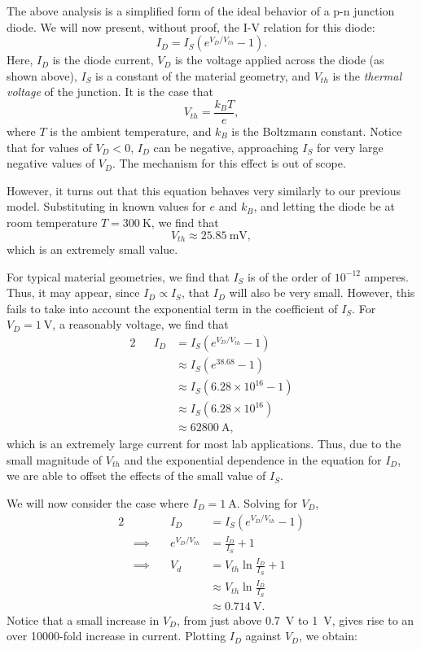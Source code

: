 \documentclass[letterpaper]{article}
\theoremstyle{remark}
\newcommand{\eqn}[1]{\begin{alignat*}{2}#1\end{alignat*}}
\newcommand*{\thus}{&\implies\quad&}
\begin{document}
The above analysis is a simplified form of the ideal behavior of a p-n junction diode. We will now present, without proof, the I-V relation for this diode:
\[
    I_D = I_S(e^{V_D / V_{th}} - 1).
\]
Here, $I_D$ is the diode current, $V_D$ is the voltage applied across the diode (as shown above), $I_S$ is a constant of the material geometry, and $V_{th}$ is the \emph{thermal voltage} of the junction. It is the case that 
\[
    V_{th} = \frac{k_BT}{e},
\]
where $T$ is the ambient temperature, and $k_B$ is the Boltzmann constant. Notice that for values of $V_D < 0$, $I_D$ can be negative, approaching $I_S$ for very large negative values of $V_D$. The mechanism for this effect is out of scope.

However, it turns out that this equation behaves very similarly to our previous model. Substituting in known values for $e$ and $k_B$, and letting the diode be at room temperature $T = \SI{300}{\kelvin}$, we find that
\[
    V_{th} \approx \SI{25.85}{\milli\volt},
\]
which is an extremely small value.

For typical material geometries, we find that $I_S$ is of the order of $10^{-12}$ amperes. Thus, it may appear, since $I_D \propto I_S$, that $I_D$ will also be very small. However, this fails to take into account the exponential term in the coefficient of $I_S$. For $V_D = \SI{1}{\volt}$, a reasonably voltage, we find that
\eqn{
    && I_D &= I_S(e^{V_D / V_{th}} - 1) \\
    &&&\approx I_S(e^{38.68} - 1) \\
    &&&\approx I_S(6.28 \times 10^{16} - 1) \\
    &&&\approx I_S(6.28 \times 10^{16}) \\
    &&&\approx \SI{62800}{\ampere},
}
which is an extremely large current for most lab applications. Thus, due to the small magnitude of $V_{th}$ and the exponential dependence in the equation for $I_D$, we are able to offset the effects of the small value of $I_S$.

We will now consider the case where $I_D = \SI{1}{\ampere}$. Solving for $V_D$,
\eqn{
    && I_D &= I_S(e^{V_D / V_{th}} - 1) \\
    \thus e^{V_D / V_{th}} &= \frac{I_D}{I_S} + 1 \\
    \thus V_d &= V_{th} \ln{\frac{I_D}{I_S} + 1} \\
    &&&\approx V_{th} \ln{\frac{I_D}{I_S}} \\
    &&&\approx \SI{0.714}{\volt}.
}
Notice that a small increase in $V_{D}$, from just above \SI{0.7}{\volt} to \SI{1}{\volt}, gives rise to an over 10000-fold increase in current. Plotting $I_D$ against $V_D$, we obtain:
\begin{center}
\end{center}
\end{document}
